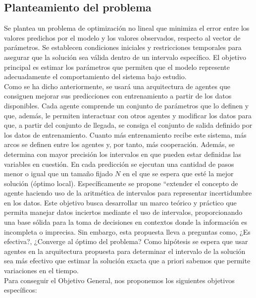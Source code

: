\subsection*{Planteamiento del problema}

Se plantea un problema de optimización no lineal que minimiza el error entre los valores predichos por el modelo y los valores observados, respecto al vector de parámetros. Se establecen condiciones iniciales y restricciones temporales para asegurar que la solución sea válida dentro de un intervalo específico. El objetivo principal es estimar los parámetros que permiten que el modelo represente adecuadamente el comportamiento del sistema bajo estudio. \\

Como se ha dicho anteriormente, se usará una arquitectura de agentes que consiguen mejorar sus predicciones con entrenamiento a partir de los datos disponibles. Cada agente comprende un conjunto de parámetros que lo definen y que, además, le permiten interactuar con otros agentes y modificar los datos para que, a partir del conjunto de llegada, se consiga el conjunto de salida definido por los datos de entrenamiento. Cuanto más entrenamiento recibe este sistema, más arcos se definen entre los agentes y, por tanto, más cooperación. Además, se determina con mayor precisión los intervalos en que pueden estar definidas las variables en cuestión. En cada predicción se ejecutan una cantidad de pasos menor o igual que un tamaño fijado $N$ en el que se espera que esté la mejor solución (óptimo local). Específicamente se propone ``extender el concepto de agente haciendo uso de la aritmética de intervalos para representar incertidumbre en los datos. Este objetivo busca desarrollar un marco teórico y práctico que permita manejar datos inciertos mediante el uso de intervalos, proporcionando una base sólida para la toma de decisiones en contextos donde la información es incompleta o imprecisa. Sin embargo, esta propuesta lleva a preguntas como, ¿Es efectiva?, ¿Converge al óptimo del problema? Como hipótesis se espera que usar agentes en la arquitectura propuesta para determinar el intervalo de la solución sea más efectivo que estimar la solución exacta que a priori sabemos que permite variaciones en el tiempo. \\

Para conseguir el Objetivo General, nos proponemos los siguientes objetivos específicos:

